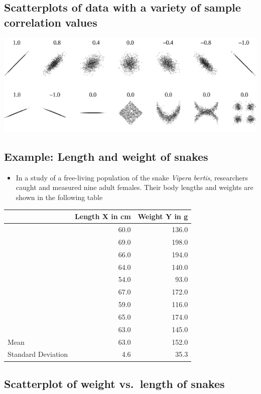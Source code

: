 \documentclass[
]{book}
\providecommand{\tightlist}{%
  \setlength{\itemsep}{0pt}\setlength{\parskip}{0pt}}
\begin{document}
\hypertarget{scatterplots-of-data-with-a-variety-of-sample-correlation-values}{%
\subsection{Scatterplots of data with a variety of sample correlation values}\label{scatterplots-of-data-with-a-variety-of-sample-correlation-values}}

\includegraphics[width=0.5\linewidth]{./11_37}

\hypertarget{example-length-and-weight-of-snakes}{%
\subsection{Example: Length and weight of snakes}\label{example-length-and-weight-of-snakes}}

\begin{itemize}
\tightlist
\item
  In a study of a free-living population of the snake \emph{Vipera bertis}, researchers caught and measured nine adult females. Their body lengths and weights are shown in the following table
\end{itemize}

\begin{tabular}{l|r|r}
\hline
  &  Length X in cm &  Weight Y in g\\
\hline
 & 60.0 & 136.0\\
\hline
 & 69.0 & 198.0\\
\hline
 & 66.0 & 194.0\\
\hline
 & 64.0 & 140.0\\
\hline
 & 54.0 & 93.0\\
\hline
 & 67.0 & 172.0\\
\hline
 & 59.0 & 116.0\\
\hline
 & 65.0 & 174.0\\
\hline
 & 63.0 & 145.0\\
\hline
Mean & 63.0 & 152.0\\
\hline
Standard Deviation & 4.6 & 35.3\\
\hline
\end{tabular}

\hypertarget{scatterplot-of-weight-vs.-length-of-snakes}{%
\subsection{Scatterplot of weight vs.~length of snakes}\label{scatterplot-of-weight-vs.-length-of-snakes}}
\end{document}
